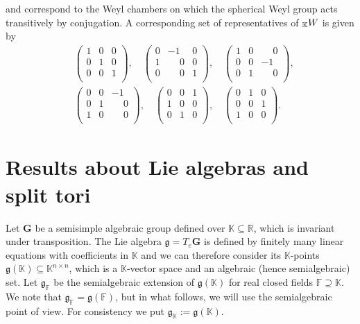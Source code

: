 \documentclass[12pt]{amsart}
\newcommand{\F}{\mathbb{F} }
\newcommand{\R}{\mathbb{R} }
\newcommand{\K}{\mathbb{K}}
\newcommand{\frakg}{\mathfrak{g}}
\newcommand{\bG}{\mathbf{G}}
\newcommand{\KW}{\vphantom{W}_{\K}W}
\numberwithin{equation}{section}
\theoremstyle{remark} %
\begin{document}
and correspond to the Weyl chambers on which the spherical Weyl group acts transitively by conjugation. A corresponding set of representatives of $\KW$ is given by 
	\begin{align*}
		&\begin{pmatrix}
			1 & 0 & 0 \\
			0 & 1 & 0 \\
			0 & 0 & 1 \\
		\end{pmatrix}, \quad
		\begin{pmatrix}
			0 & -1 & 0 \\
			1 & \phantom{-}0 & 0 \\
			0 & \phantom{-}0 & 1 \\
		\end{pmatrix}, \quad
		\begin{pmatrix}
			1 & 0 & \phantom{-}0 \\
			0 & 0 & -1 \\
			0 & 1 & \phantom{-}0 \\
		\end{pmatrix}, \\
		&\begin{pmatrix}
			0 & 0 & -1 \\
			0 & 1 & \phantom{-}0 \\
			1 & 0 & \phantom{-}0 \\
		\end{pmatrix}, \quad
		\begin{pmatrix}
			0 & 0 & 1 \\
			1 & 0 & 0 \\
			0 & 1 & 0 \\
		\end{pmatrix}, \quad
		\begin{pmatrix}
			0 & 1 & 0 \\
			0 & 0 & 1 \\
			1 & 0 & 0 \\
		\end{pmatrix}.
	\end{align*}


\section{Results about Lie algebras and split tori}\label{sec:Lie_algebra_results}
Let $\bG$ be a semisimple algebraic group defined over $\K \subseteq \R$, which is invariant under transposition. The Lie algebra $\frakg = T_e\bG$ is defined by finitely many linear equations with coefficients in $\K$ and we can therefore consider its $\K$-points $\frakg(\K) \subseteq \K^{n\times n}$, which is a $\K$-vector space and an algebraic (hence semialgebraic) set. Let $\frakg_\F$ be the semialgebraic extension of $\frakg(\K)$ for real closed fields $\F \supseteq \K$. We note that $\frakg_{\F} = \frakg(\F)$, but in what follows, we will use the semialgebraic point of view. For consistency we put $\frakg_{\K}:= \frakg(\K)$.
\end{document}
